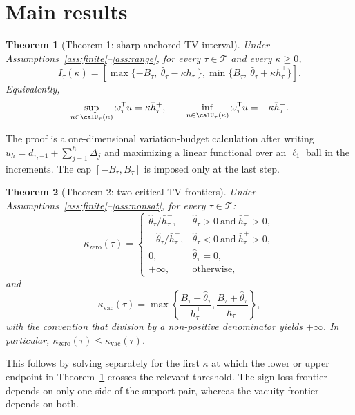 \documentclass[11pt]{article}
\newcommand{\transpose}{\mathsf{T}}
\theoremstyle{definition}
\theoremstyle{plain}
\newtheorem{theorem}{Theorem}
\theoremstyle{remark}
\begin{document}
\section{Main results}
\begin{theorem}[Theorem 1: sharp anchored-TV interval]\label{thm:interval}
Under Assumptions~\ref{ass:finite}--\ref{ass:range}, for every \(\tau\in\mathcal T\) and every \(\kappa\ge 0\),
\[
  I_\tau(\kappa)
  =
  \left[
    \max\{-B_\tau,\ \hat\theta_\tau-\kappa \bar h_\tau^{-}\},
    \min\{ B_\tau,\ \hat\theta_\tau+\kappa \bar h_\tau^{+}\}
  \right].
\]
Equivalently,
\[
  \sup_{u\in\calU_\tau(\kappa)}\omega_\tau^\transpose u
  =
  \kappa \bar h_\tau^{+},
  \qquad
  \inf_{u\in\calU_\tau(\kappa)}\omega_\tau^\transpose u
  =
  -\kappa \bar h_\tau^{-}.
\]
\end{theorem}
The proof is a one-dimensional variation-budget calculation after writing \(u_h=d_{\tau,-1}+\sum_{j=1}^{h}\Delta_j\) and maximizing a linear functional over an \(\ell_1\) ball in the increments. The cap \([-B_\tau,B_\tau]\) is imposed only at the last step.

\begin{theorem}[Theorem 2: two critical TV frontiers]\label{thm:frontiers}
Under Assumptions~\ref{ass:finite}--\ref{ass:nonsat}, for every \(\tau\in\mathcal T\):
\[
  \kappa_{\mathrm{zero}}(\tau)
  =
  \begin{cases}
    \hat\theta_\tau/\bar h_\tau^{-}, & \hat\theta_\tau>0\ \text{and}\ \bar h_\tau^{-}>0,\\[0.4em]
    -\hat\theta_\tau/\bar h_\tau^{+}, & \hat\theta_\tau<0\ \text{and}\ \bar h_\tau^{+}>0,\\[0.4em]
    0, & \hat\theta_\tau=0,\\[0.4em]
    +\infty, & \text{otherwise,}
  \end{cases}
\]
and
\[
  \kappa_{\mathrm{vac}}(\tau)
  =
  \max\left\{
    \frac{B_\tau-\hat\theta_\tau}{\bar h_\tau^{+}},
    \frac{B_\tau+\hat\theta_\tau}{\bar h_\tau^{-}}
  \right\},
\]
with the convention that division by a non-positive denominator yields \(+\infty\). In particular, \(\kappa_{\mathrm{zero}}(\tau)\le \kappa_{\mathrm{vac}}(\tau)\).
\end{theorem}
This follows by solving separately for the first \(\kappa\) at which the lower or upper endpoint in Theorem~\ref{thm:interval} crosses the relevant threshold. The sign-loss frontier depends on only one side of the support pair, whereas the vacuity frontier depends on both.
\end{document}
